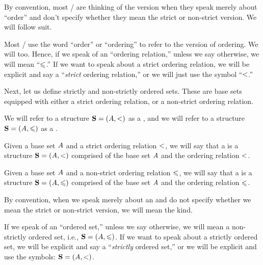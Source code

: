\documentclass[../../../main.tex]{subfiles}
\begin{document}
\begin{terminology}
  By convention, most \mathers/ are thinking of the  version when they speak merely about ``order'' and don't specify whether they mean the strict or non-strict version. We will follow suit.
\end{terminology}

Most \mathers/ use the word ``order'' or ``ordering'' to refer to the  version of ordering. We will too. Hence, if we speak of an ``ordering relation,'' unless we say otherwise, we will mean ``$\order/$.'' If we want to speak about a strict ordering relation, we will be explicit and say a ``\emph{strict} ordering relation,'' or we will just use the symbol ``$\strictorder/$.'' 

Next, let us define strictly and non-strictly ordered sets. These are base sets equipped with either a strict ordering relation, or a non-strict ordering relation.

\begin{terminology}
  We will refer to a structure $\struct{S} = (\set{A}, \strictorder/)$ as a , and we will refer to a structure $\struct{S} = (\set{A}, \order/)$ as a .
\end{terminology}

\begin{fdefinition}
  \label{def:ordered-sets}
  Given a base set $A$ and a strict ordering relation $\strictorder/$, we will say that a  is a structure $\struct{S} = (\set{A}, \strictorder/)$ comprised of the base set $A$ and the ordering relation $\strictorder/$.
  
  Given a base set $A$ and a non-strict ordering relation $\order/$, we will say that a  is a structure $\struct{S} = (\set{A}, \order/)$ comprised of the base set $A$ and the ordering relation $\order/$.
\end{fdefinition}

\begin{terminology}
  By convention, when we speak merely about an  and do not specify whether we mean the strict or non-strict version, we will mean the  kind.
\end{terminology}

If we speak of an ``ordered set,'' unless we say otherwise, we will mean a non-strictly ordered set, i.e., $\struct{S} = (\set{A}, \order/)$. If we want to speak about a strictly ordered set, we will be explicit and say a ``\emph{strictly} ordered set,'' or we will be explicit and use the symbols: $\struct{S} = (\set{A}, \strictorder/)$.
\end{document}

